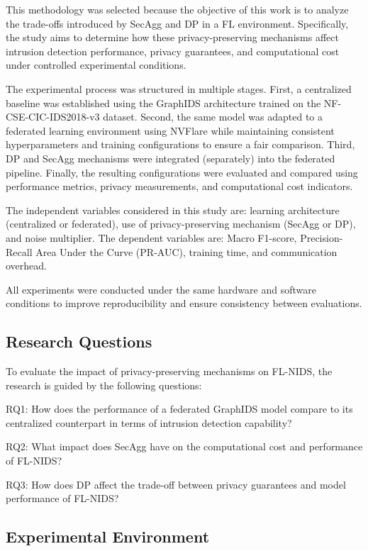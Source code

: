 \documentclass[conference]{IEEEtran}
\begin{document}
This methodology was selected because the objective of this work is to analyze the trade-offs introduced by SecAgg and DP in a FL environment. Specifically, the study aims to determine how these privacy-preserving mechanisms affect intrusion detection performance, privacy guarantees, and computational cost under controlled experimental conditions.

The experimental process was structured in multiple stages. First, a centralized baseline was established using the GraphIDS architecture trained on the NF-CSE-CIC-IDS2018-v3 dataset. Second, the same model was adapted to a federated learning environment using NVFlare while maintaining consistent hyperparameters and training configurations to ensure a fair comparison. Third, DP and SecAgg mechanisms were integrated (separately) into the federated pipeline. Finally, the resulting configurations were evaluated and compared using performance metrics, privacy measurements, and computational cost indicators.

The independent variables considered in this study are: learning architecture (centralized or federated), use of privacy-preserving mechanism (SecAgg or DP), and noise multiplier. The dependent variables are: Macro F1-score, Precision-Recall Area Under the Curve (PR-AUC), training time, and communication overhead.

All experiments were conducted under the same hardware and software conditions to improve reproducibility and ensure consistency between evaluations.

\subsection{Research Questions}

To evaluate the impact of privacy-preserving mechanisms on FL-NIDS, the research is guided by the following questions:

RQ1: How does the performance of a federated GraphIDS model compare to its centralized counterpart in terms of intrusion detection capability?

RQ2: What impact does SecAgg have on the computational cost and performance of FL-NIDS?

RQ3: How does DP affect the trade-off between privacy guarantees and model performance of FL-NIDS?

\subsection{Experimental Environment}
\end{document}
